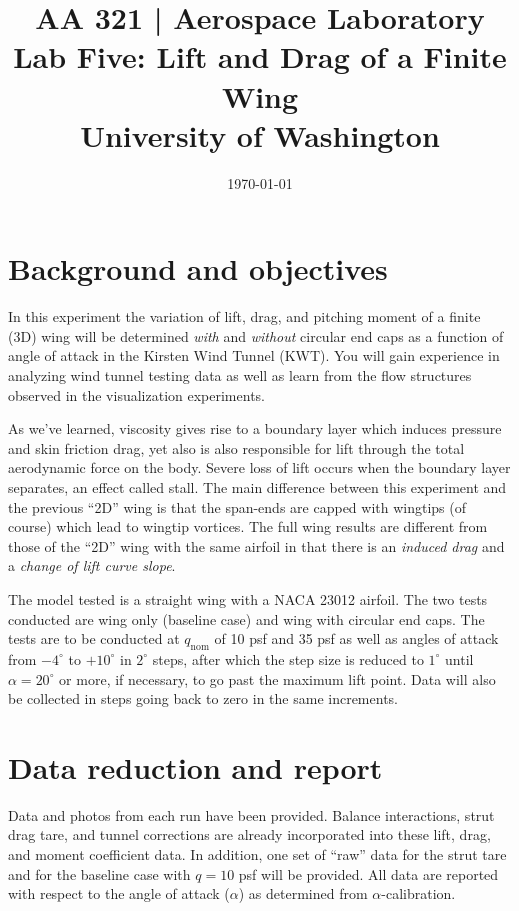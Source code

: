 \documentclass[12pt]{article}
\begin{document}
\title{\Large {\bf AA 321 | Aerospace Laboratory\\Lab Five: Lift and Drag of a Finite Wing}\\[1ex]
  University of Washington}
\date{\today}
\maketitle

\section{Background and objectives}\label{objs}
In this experiment the variation of lift, drag, and pitching moment of a finite (3D) wing will be determined \textit{with} and \textit{without} circular end caps as a function of angle of attack in the Kirsten Wind Tunnel (KWT). You will gain experience in analyzing wind tunnel testing data as well as learn from the flow structures observed in the visualization experiments.

As we've learned, viscosity gives rise to a boundary layer which induces pressure and skin friction drag, yet also is also responsible for lift through the total aerodynamic force on the body. Severe loss of lift occurs when the boundary layer separates, an effect called stall. The main difference between this experiment and the previous ``2D'' wing is that the span-ends are capped with wingtips (of course) which lead to wingtip vortices. The full wing results are different from those of the ``2D'' wing with the same airfoil in that there is an \textit{induced drag} and a \textit{change of lift curve slope}.

The model tested is a straight wing with a NACA 23012 airfoil. The two tests conducted are wing only (baseline case) and wing with circular end caps. The tests are to be conducted at $q_{\text{nom}}$ of 10 psf and 35 psf as well as angles of attack from $-4^\circ$ to $+10^\circ$ in $2^\circ$ steps, after which the step size is reduced to $1^\circ$ until $\alpha = 20^\circ$ or more, if necessary, to go past the maximum lift point. Data will also be collected in steps going back to zero in the same increments.

\section{Data reduction and report}
Data and photos from each run have been provided. Balance interactions, strut drag tare, and tunnel corrections are already incorporated into these lift, drag, and moment coefficient data. In addition, one set of ``raw'' data for the strut tare and for the baseline case with $q=10$ psf will be provided. All data are reported with respect to the angle of attack ($\alpha$) as determined from $\alpha$-calibration.
\end{document}
